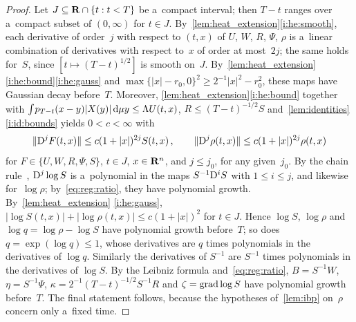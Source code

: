 \documentclass[a4paper,twoside,leqno]{article}
\begin{document}
\begin{proof}
    Let $J \subseteq \mathbf{R} \cap \{ t : t < T \}$ be a~compact interval; then $T - t$ ranges over
    a~compact subset of $(0,\infty)$ for $t \in J$. By~\ref{lem:heat_extension}\ref{i:he:smooth},
    each derivative of order~$j$ with respect to $(t,x)$ of $U$, $W$, $R$, $\Psi$, $\rho$ is
    a~linear combination of derivatives with respect to~$x$ of order at most~$2j$; the same holds
    for~$S$, since $[t \mapsto (T-t)^{1/2}]$ is smooth on~$J$. By~\ref{lem:heat_extension}
    \ref{i:he:bound}\ref{i:he:gauss} and $\max \{ |x| - r_0, 0 \}^2 \ge 2^{-1} |x|^2 - r_0^2$,
    these maps have Gaussian decay before~$T$. Moreover, \ref{lem:heat_extension}\ref{i:he:bound}
    together with ${\textstyle\int_{}^{}} p_{T-t}(x-y) |X(y)| \,\mathrm{d} \mu y \le \Lambda U(t,x)$, $R \le
    (T-t)^{-1/2} S$ and~\ref{lem:identities}\ref{i:id:bounds} yields $0 < c < \infty$ with
    \begin{equation}
        \label{eq:reg:ratio}
        \|\mathrm{D}^j F(t,x)\| \le c (1 + |x|)^{2j} S(t,x) \,, \qquad
        \|\mathrm{D}^j \rho(t,x)\| \le c (1 + |x|)^{2j} \rho(t,x)
    \end{equation}
    for $F \in \{ U, W, R, \Psi, S \}$, $t \in J$, $x \in \mathbf{R}^{n}$, and $j \le j_0$, for any
    given~$j_0$. By the chain rule~\cite[3.1.11]{Federer1969}, $\mathrm{D}^j \log S$ is a~polynomial in
    the maps $S^{-1} \mathrm{D}^i S$ with $1 \le i \le j$, and likewise for~$\log \rho$;
    by~\eqref{eq:reg:ratio}, they have polynomial growth. By~\ref{lem:heat_extension}
    \ref{i:he:gauss}, $|\log S(t,x)| + |\log \rho(t,x)| \le c (1 + |x|)^2$ for $t \in J$. Hence
    $\log S$, $\log \rho$ and $\log q = \log \rho - \log S$ have polynomial growth before~$T$; so
    does $q = \exp(\log q) \le 1$, whose derivatives are $q$ times polynomials in the derivatives
    of $\log q$. Similarly the derivatives of $S^{-1}$ are $S^{-1}$ times polynomials in the
    derivatives of $\log S$. By the Leibniz formula and~\eqref{eq:reg:ratio}, $B = S^{-1} W$,
    $\eta = S^{-1} \Psi$, $\kappa = 2^{-1} (T-t)^{-1/2} S^{-1} R$ and $\zeta = \operatorname{grad} \log S$ have
    polynomial growth before~$T$. The final statement follows, because the hypotheses
    of~\ref{lem:ibp} on~$\rho$ concern only a~fixed time.
\end{proof}
\end{document}
